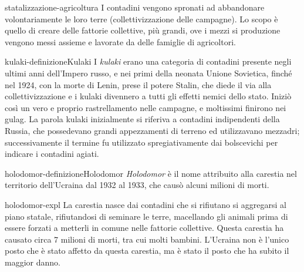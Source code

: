 \documentclass[preview]{standalone}
\begin{document}
\begin{snippet}{statalizzazione-agricoltura}
    I contadini vengono spronati ad abbandonare volontariamente le loro terre
    (collettivizzazione delle campagne).
    Lo scopo è quello di creare delle fattorie collettive, più grandi,
    ove i mezzi si produzione vengono messi assieme e lavorate da delle famiglie
    di agricoltori.
\end{snippet}

\begin{snippetdefinition}{kulaki-definizione}{Kulaki}
    I \textit{kulaki} erano una categoria di contadini
    presente negli ultimi anni dell'Impero russo, e nei primi
    della neonata Unione Sovietica, finché nel 1924,
    con la morte di Lenin, prese il potere Stalin, che diede il
    via alla collettivizzazione e i kulaki divennero a tutti gli effetti
    nemici dello stato. Iniziò così un vero e proprio rastrellamento nelle
    campagne, e moltissimi finirono nei gulag.
    La parola kulaki inizialmente si riferiva a contadini indipendenti
    della Russia, che possedevano grandi appezzamenti di terreno ed
    utilizzavano mezzadri; successivamente il termine fu utilizzato
    spregiativamente dai bolscevichi per indicare i contadini agiati. 
\end{snippetdefinition}

\begin{snippetdefinition}{holodomor-definizione}{Holodomor}
    \textit{Holodomor} è il nome attribuito alla carestia nel territorio dell'Ucraina dal 1932 al 1933, che causò alcuni milioni di morti.
\end{snippetdefinition}

\begin{snippet}{holodomor-expl}
    La carestia nasce dai contadini che si rifiutano si aggregarsi al piano statale,
    rifiutandosi di seminare le terre, macellando gli animali prima
    di essere forzati a metterli in comune nelle fattorie collettive.
    Questa carestia ha causato circa 7 milioni di morti, tra cui molti bambini.
    L'Ucraina non è l'unico posto che è stato affetto da questa carestia,
    ma è stato il posto che ha subito il maggior danno.
\end{snippet}

\end{document}
